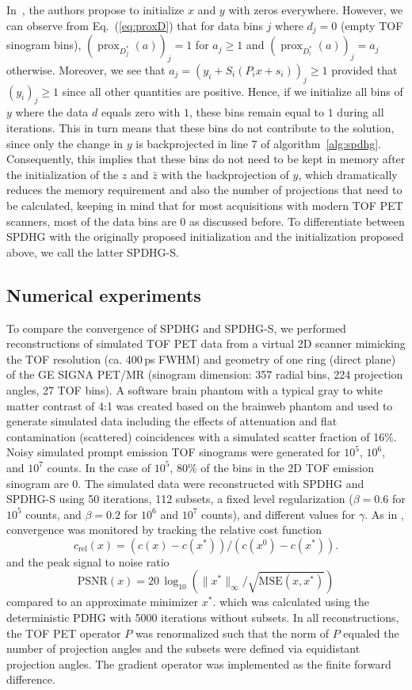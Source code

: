 \documentclass[11pt,twocolumn,twoside]{article}
\DeclareMathOperator{\prox}{prox}
\begin{document}
In~\cite{Ehrhardt2019}, the authors propose to initialize $x$ and $y$ with zeros everywhere.
However, we can observe from Eq.~(\ref{eq:proxD}) that for data bins $j$ where $d_j = 0$ 
(empty TOF sinogram bins), 
$(\prox_{D_j^*}(a))_j = 1$ for $a_j \geq 1$ and $(\prox_{D_i^*}(a))_j = a_j$ otherwise. 
Moreover, we see that $ a_j = (y_i + S_i (P_i x + s_i) )_j \geq 1$ provided that $(y_i)_j \geq 1$ 
since all other quantities are positive. 
Hence, if we initialize all bins of $y$ where the data $d$ equals zero with $1$, 
these bins remain equal to $1$ during all iterations. 
This in turn means that these bins do not contribute to the solution, since only the change
in $y$ is backprojected in line 7 of algorithm~\ref{alg:spdhg}.
Consequently, this implies that these bins do not need to be kept in memory after the initialization
of the $z$ and $\bar{z}$ with the backprojection of $y$, which dramatically reduces the memory
requirement and also the number of projections that need to be calculated, keeping in mind that
for most acquisitions with modern TOF PET scanners, most of the data bins are 0 as discussed before.
To differentiate between SPDHG with the originally proposed initialization and the initialization proposed
above, we call the latter SPDHG-S.


\subsection{Numerical experiments}

To compare the convergence of SPDHG and SPDHG-S, we performed reconstructions of simulated
TOF PET data from a virtual 2D scanner mimicking the TOF resolution (ca. 400\,ps FWHM) and 
geometry of one ring (direct plane) of the GE SIGNA PET/MR (sinogram dimension: 
357 radial bins, 224 projection angles, 27 TOF bins).
A software brain phantom with a typical gray to white matter contrast of 4:1 was created
based on the brainweb phantom and used to generate simulated data including the effects
of attenuation and flat contamination (scattered) coincidences
with a simulated scatter fraction of 16\%.
Noisy simulated prompt emission TOF sinograms were generated for $10^5$, $10^6$, 
and $10^7$ counts. 
In the case of $10^5$, 80\% of the bins in the 2D TOF emission sinogram are 0.
The simulated data were reconstructed with SPDHG and SPDHG-S using 50 iterations, 112 subsets,
a fixed level regularization ($\beta = 0.6$ for $10^5$ counts, and $\beta = 0.2$ for $10^6$
and $10^7$ counts), and different values for $\gamma$.
As in \cite{Ehrhardt2019}, convergence was monitored by tracking the relative cost function
\[ c_\text{rel}(x) = (c(x) - c(x^*)) / (c(x^0) - c(x^*)). \]
and the peak signal to noise ratio 
\[ \text{PSNR}(x) = 20\,\log_{10} \left( \|x^*\|_\infty/\sqrt{\text{MSE}(x,x^*)} \right) \]
compared to an approximate minimizer $x^*$.
which was calculated using the deterministic PDHG with 5000 iterations without subsets.
In all reconstructions, the TOF PET operator $P$ was renormalized such that the norm of $P$
equaled the number of projection angles and the
subsets were defined via equidistant projection angles.
The gradient operator was implemented as the finite forward difference.
\end{document}
